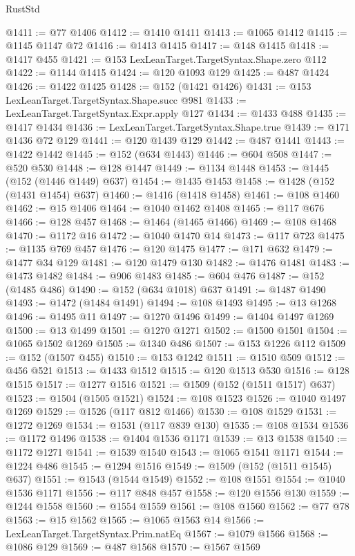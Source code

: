 \begin{lexlean}{RustStd}
\begin{coremodule}
@1411 := @77 @1406
@1412 := @1410 @1411
@1413 := @1065 @1412
@1415 := @1145 @1147 @72
@1416 := @1413 @1415
@1417 := @148 @1415
@1418 := @1417 @455
@1421 := @153 LexLeanTarget.TargetSyntax.Shape.zero @112
@1422 := @1144 @1415
@1424 := @120 @1093 @129
@1425 := @487 @1424
@1426 := @1422 @1425
@1428 := @152 (@1421 @1426)
@1431 := @153 LexLeanTarget.TargetSyntax.Shape.succ @981
@1433 := LexLeanTarget.TargetSyntax.Expr.apply @127
@1434 := @1433 @488
@1435 := @1417 @1434
@1436 := LexLeanTarget.TargetSyntax.Shape.true
@1439 := @171 @1436 @72 @129
@1441 := @120 @1439 @129
@1442 := @487 @1441
@1443 := @1422 @1442
@1445 := @152 (@634 @1443)
@1446 := @604 @508
@1447 := @520 @530
@1448 := @128 @1447
@1449 := @1134 @1448
@1453 := @1445 (@152 (@1446 @1449) @637)
@1454 := @1435 @1453
@1458 := @1428 (@152 (@1431 @1454) @637)
@1460 := @1416 (@1418 @1458)
@1461 := @108 @1460
@1462 := @15 @1406
@1464 := @1040 @1462 @1408
@1465 := @117 @676
@1466 := @128 @457
@1468 := @1464 (@1465 @1466)
@1469 := @108 @1468
@1470 := @1172 @16
@1472 := @1040 @1470 @14
@1473 := @117 @723
@1475 := @1135 @769 @457
@1476 := @120 @1475
@1477 := @171 @632
@1479 := @1477 @34 @129
@1481 := @120 @1479 @130
@1482 := @1476 @1481
@1483 := @1473 @1482
@1484 := @906 @1483
@1485 := @604 @476
@1487 := @152 (@1485 @486)
@1490 := @152 (@634 @1018) @637
@1491 := @1487 @1490
@1493 := @1472 (@1484 @1491)
@1494 := @108 @1493
@1495 := @13 @1268
@1496 := @1495 @11
@1497 := @1270 @1496
@1499 := @1404 @1497 @1269
@1500 := @13 @1499
@1501 := @1270 @1271
@1502 := @1500 @1501
@1504 := @1065 @1502 @1269
@1505 := @1340 @486
@1507 := @153 @1226 @112
@1509 := @152 (@1507 @455)
@1510 := @153 @1242
@1511 := @1510 @509
@1512 := @456 @521
@1513 := @1433 @1512
@1515 := @120 @1513 @530
@1516 := @128 @1515
@1517 := @1277 @1516
@1521 := @1509 (@152 (@1511 @1517) @637)
@1523 := @1504 (@1505 @1521)
@1524 := @108 @1523
@1526 := @1040 @1497 @1269
@1529 := @1526 (@117 @812 @1466)
@1530 := @108 @1529
@1531 := @1272 @1269
@1534 := @1531 (@117 @839 @130)
@1535 := @108 @1534
@1536 := @1172 @1496
@1538 := @1404 @1536 @1171
@1539 := @13 @1538
@1540 := @1172 @1271
@1541 := @1539 @1540
@1543 := @1065 @1541 @1171
@1544 := @1224 @486
@1545 := @1294 @1516
@1549 := @1509 (@152 (@1511 @1545) @637)
@1551 := @1543 (@1544 @1549)
@1552 := @108 @1551
@1554 := @1040 @1536 @1171
@1556 := @117 @848 @457
@1558 := @120 @1556 @130
@1559 := @1244 @1558
@1560 := @1554 @1559
@1561 := @108 @1560
@1562 := @77 @78
@1563 := @15 @1562
@1565 := @1065 @1563 @14
@1566 := LexLeanTarget.TargetSyntax.Prim.natEq
@1567 := @1079 @1566
@1568 := @1086 @129
@1569 := @487 @1568
@1570 := @1567 @1569

\end{coremodule}
\end{lexlean}
